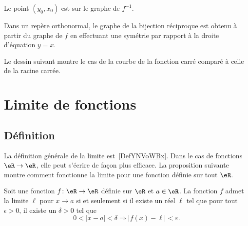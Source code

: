         Le point \( (y_0,x_0)\) est sur le graphe de \( f^{-1}\).

\begin{Aretenir}
    Dans un repère orthonormal, le graphe de la bijection réciproque est obtenu à partir du graphe de \( f\) en effectuant une symétrie par rapport à la droite d'équation \( y=x\).
\end{Aretenir}

Le dessin suivant montre le cas de la courbe de la fonction carré comparé à celle de la racine carrée.
\begin{center}
   
\end{center}

\section{Limite de fonctions}

\subsection{Définition}

La définition générale de la limite est~\ref{DefYNVoWBx}. Dans le cas de fonctions \( \eR\to \eR\), elle peut s'écrire de façon plus efficace. La proposition suivante montre comment fonctionne la limite pour une fonction définie sur tout \( \eR\).

\begin{proposition}       \label{PropAJQQooQQClfp}
	Soit une fonction $f\colon \eR\to \eR$ définie sur \( \eR\) et $a\in \eR$. La fonction \( f\) admet la limite \( \ell\) pour \( x\to a\) si et seulement si il existe un réel $\ell$ tel que pour tout \( \epsilon>0\), il existe un \( \delta>0\) tel que
	\begin{equation}\label{EqDefLimiteFonction}
		0<| x-a |<\delta\Rightarrow| f(x)-\ell |<\varepsilon.
	\end{equation}
\end{proposition}

